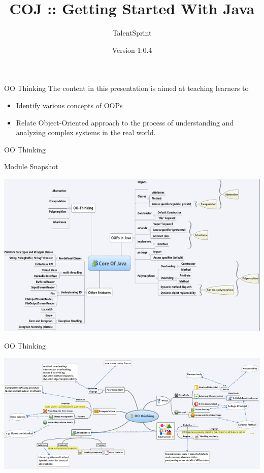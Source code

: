 \documentclass[14pt]{beamer}
\title[CP01.13 BC]{COJ :: Getting Started With Java}
\author[TS]{TalentSprint}
\institute[L\&D]{Licensed To Skill}
\date{Version 1.0.4}
\begin{document}
\begin{frame}
  \titlepage
\end{frame}
\begin{frame}{OO Thinking}
The content in this presentation is aimed at teaching  learners to
 \begin{itemize}
  \item Identify various concepts of OOPs
  \item Relate Object-Oriented approach to the process of understanding and analyzing complex systems in the real world.
 \end{itemize}
\end{frame}
\begin{frame}{OO Thinking}

Module Snapshot
\begin{center}
    \includegraphics[scale=0.4]{ModuleSnapShot.png}
  \end{center}
\end{frame}

\begin{frame}{OO Thinking}
\begin{center}
    \includegraphics[scale=0.4]{Image2.png}
  \end{center}
\end{frame}
\end{document}
